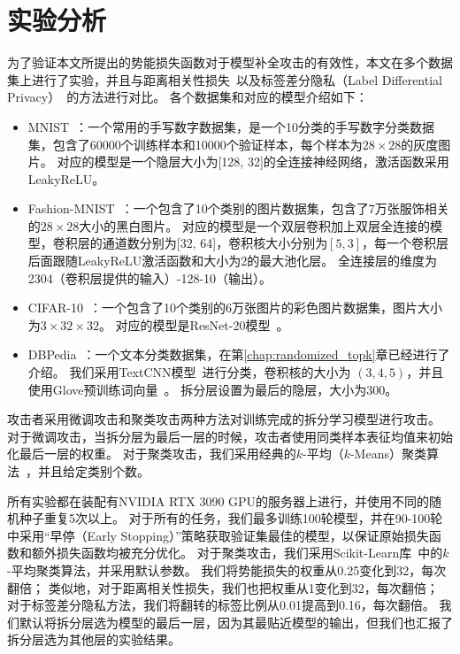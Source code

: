 \section{实验分析}
为了验证本文所提出的势能损失函数对于模型补全攻击的有效性，本文在多个数据集上进行了实验，并且与距离相关性损失~\cite{vepakomma2020nopeek,sunjiankai2022forward_embedding_protect}以及标签差分隐私（Label Differential Privacy）~\cite{wuruihan_2023_label_dp}的方法进行对比。
%
各个数据集和对应的模型介绍如下：
\begin{itemize}
    \item MNIST~\cite{mnist}：一个常用的手写数字数据集，是一个10分类的手写数字分类数据集，包含了60000个训练样本和10000个验证样本，每个样本为$28\times 28$的灰度图片。
    对应的模型是一个隐层大小为[128, 32]的全连接神经网络，激活函数采用LeakyReLU。
    
    \item Fashion-MNIST~\cite{fashion}：一个包含了10个类别的图片数据集，包含了7万张服饰相关的$28\times 28$大小的黑白图片。
    对应的模型是一个双层卷积加上双层全连接的模型，卷积层的通道数分别为[32, 64]，卷积核大小分别为$[5, 3]$，每一个卷积层后面跟随LeakyReLU激活函数和大小为2的最大池化层。
    全连接层的维度为2304（卷积层提供的输入）-128-10（输出）。
    
    \item CIFAR-10~\cite{krizhevsky_2009_cifar}：一个包含了10个类别的6万张图片的彩色图片数据集，图片大小为$3\times 32\times 32$。
    对应的模型是ResNet-20模型~\cite{hekaiming2016resnet}。

    \item DBPedia~\cite{2007dbpedia}：一个文本分类数据集，在第\ref{chap:randomized_topk}章已经进行了介绍。
    我们采用TextCNN模型~\cite{kimyoon2014textcnn}进行分类，卷积核的大小为 $(3,4,5)$，并且使用Glove预训练词向量~\cite{pennington2014glove}。
    拆分层设置为最后的隐层，大小为300。
\end{itemize}
%

攻击者采用微调攻击和聚类攻击两种方法对训练完成的拆分学习模型进行攻击。
对于微调攻击，当拆分层为最后一层的时候，攻击者使用同类样本表征均值来初始化最后一层的权重。
对于聚类攻击，我们采用经典的$k$-平均（$k$-Means）聚类算法~\cite{macqueen1967kmeans}，并且给定类别个数。

所有实验都在装配有NVIDIA RTX 3090 GPU的服务器上进行，并使用不同的随机种子重复5次以上。
%
对于所有的任务，我们最多训练100轮模型，并在90-100轮中采用“早停（Early Stopping）”策略获取验证集最佳的模型，以保证原始损失函数和额外损失函数均被充分优化。
%
对于聚类攻击，我们采用Scikit-Learn库~\cite{pedregosa_2011_scikit}中的$k$-平均聚类算法，并采用默认参数。
%
我们将势能损失的权重从0.25变化到32，每次翻倍；
类似地，对于距离相关性损失，我们也把权重从1变化到32，每次翻倍；
对于标签差分隐私方法，我们将翻转的标签比例从0.01提高到0.16，每次翻倍。
%
我们默认将拆分层选为模型的最后一层，因为其最贴近模型的输出，但我们也汇报了拆分层选为其他层的实验结果。
%



